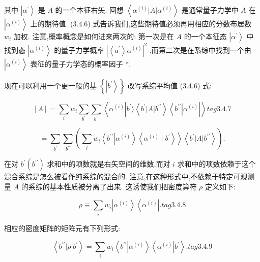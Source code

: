 其中 $\left| {\alpha }^{\prime }\right\rangle$ 是 $A$ 的一个本征右矢. 回想 $\left\langle {{\alpha }^{\left( i\right) }\left| A\right| {\alpha }^{\left( i\right) }}\right\rangle$ 是通常量子力学中 $A$ 在 $\left| {\alpha }^{\left( i\right) }\right\rangle$ 上的期待值. (3.4.6) 式告诉我们,这些期待值必须再用相应的分数布居数 ${w}_{i}$ 加权. 注意,概率概念是如何进来两次的: 第一次是在 $A$ 的一个本征态 $\left| {\alpha }^{\prime }\right\rangle$ 中找到态 $\left| {\alpha }^{\left( i\right) }\right\rangle$ 的量子力学概率 ${\left| \left\langle {a}^{\prime }\right\rangle {\alpha }^{\left( i\right) }\right| }^{2}$ ,而第二次是在系综中找到一个由 $\left| {\alpha }^{\left( i\right) }\right\rangle$ 表征的量子力学态的概率因子 *.

现在可以利用一个更一般的基 $\left\{ \left| {b}^{\prime }\right\rangle \right\}$ 改写系综平均值 (3.4.6) 式:

$$
\left\lbrack A\right\rbrack = \mathop{\sum }\limits_{i}{w}_{i}\mathop{\sum }\limits_{{b}^{\prime }}\mathop{\sum }\limits_{{b}^{\prime \prime }}\left\langle {{\alpha }^{\left( i\right) }\left| {{b}^{\prime }\rangle \left\langle {{b}^{\prime }\left| A\right| {b}^{\prime \prime }}\right\rangle \left\langle {b}^{\prime \prime }\right| {\alpha }^{\left( i\right) }}\right| }\right\rangle tag{3.4.7}
$$

$$
= \mathop{\sum }\limits_{{b}^{\prime }}\mathop{\sum }\limits_{{b}^{\prime \prime }}\left( {\mathop{\sum }\limits_{i}{w}_{i}\left\langle {{b}^{\prime \prime }\left| {\alpha }^{\left( i\right) }\right\rangle \left\langle {{\alpha }^{\left( i\right) } \mid {b}^{\prime }}\right\rangle }\right\rangle \left\langle {{b}^{\prime }\left| A\right| {b}^{\prime \prime }}\right\rangle }\right) .
$$

在对 ${b}^{\prime }\left( {b}^{\prime \prime }\right)$ 求和中的项数就是右矢空间的维数,而对 $i$ 求和中的项数依赖于这个混合系综是怎么被看作纯系综的混合的. 注意,在这种形式中,不依赖于特定可观测量 $A$ 的系综的基本性质被分离了出来. 这诱使我们把密度算符 $\rho$ 定义如下:

$$
\rho \equiv \mathop{\sum }\limits_{i}{w}_{i}\left| {\alpha }^{\left( i\right) }\right\rangle \left\langle {\alpha }^{\left( i\right) }\right| . tag{3.4.8}
$$

相应的密度矩阵的矩阵元有下列形式:

$$
\left\langle {{b}^{\prime \prime }\left| \rho \right| {b}^{\prime }}\right\rangle = \mathop{\sum }\limits_{i}{w}_{i}\left\langle {{b}^{\prime \prime }\left| {\alpha }^{\left( i\right) }\right\rangle \left\langle {\alpha }^{\left( i\right) }\right| {b}^{\prime }}\right\rangle . tag{3.4.9}
$$

